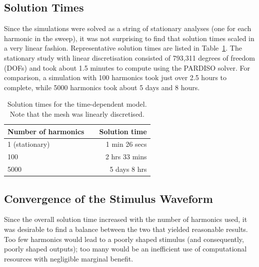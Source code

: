 \subsection{Solution Times}

Since the simulations were solved as a string of stationary analyses (one for
each harmonic in the sweep), it was not surprising to find that solution times
scaled in a very linear fashion. Representative solution times are listed in
Table~\ref{table:td_solution_times}. The stationary study with linear
discretisation consisted of 793,311 degrees of freedom (DOFs) and took about 1.5
minutes to compute using the PARDISO solver. For comparison, a simulation with
100 harmonics took just over 2.5 hours to complete, while 5000 harmonics took
about 5 days and 8 hours.

\begin{table}
	\centering
	\sffamily
	\small
	
	\caption[Solution times for the time-dependent model]{Solution times for the
	time-dependent model. Note that the mesh was linearly discretised.}
	\label{table:td_solution_times}
	
    \begin{tabular}{l r}
	\toprule
	\textbf{Number of harmonics}	& \textbf{~~Solution time} \\
	\midrule
	
	1 (stationary)	& 1 min 26 secs \\
	100				& 2 hrs 33 mins \\
	5000			& 5 days 8 hrs \\
	\bottomrule
	\end{tabular}
\end{table}




\subsection{Convergence of the Stimulus Waveform}

Since the overall solution time increased with the number of harmonics used, it
was desirable to find a balance between the two that yielded reasonable results.
Too few harmonics would lead to a poorly shaped stimulus (and consequently,
poorly shaped outputs); too many would be an inefficient use of computational
resources with negligible marginal benefit.

